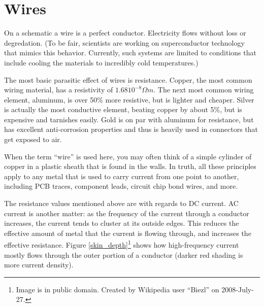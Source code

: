 \section{Wires}

On a schematic a wire is a perfect conductor. Electricity flows without loss or degredation. (To be fair, scientists are working on superconductor technology that mimics this behavior. Currently, such systems are limited to conditions that include cooling the materials to incredibly cold temperatures.)

The most basic parasitic effect of wires is resistance. Copper, the most common wiring material, has a resistivity of $1.68 \dot 10^{-8} \Omega m$. The next most common wiring element, aluminum, is over 50\% more resistive, but is lighter and cheaper. Silver is actually the most conductive element, beating copper by about 5\%, but is expensive and tarnishes easily. Gold is on par with aluminum for resistance, but has excellent anti-corrosion properties and thus is heavily used in connectors that get exposed to air.

When the term ``wire'' is used here, you may often think of a simple cylinder of copper in a plastic sheath that is found in the walls. In truth, all these principles apply to any metal that is used to carry current from one point to another, including PCB traces, component leads, circuit chip bond wires, and more.

The resistance values mentioned above are with regards to DC current. AC current is another matter: as the frequency of the current through a conductor increases, the current tends to cluster at its outside edges. This reduces the effective amount of metal that the current is flowing through, and increases the effective resistance. Figure \ref{skin_depth}\footnote{Image is in public domain. Created by Wikipedia user ``Biezl'' on 2008-July-27.} shows how high-frequency current mostly flows through the outer portion of a conductor (darker red shading is more current density).


